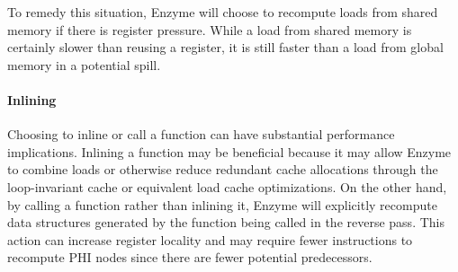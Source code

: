 To remedy this situation, Enzyme will choose to recompute loads from shared memory if there is register pressure. While a load from shared memory is certainly slower than reusing a register, it is still faster than a load from global memory in a potential spill. 

\paragraph{\textbf{Inlining}}
Choosing to inline or call a function can have substantial performance implications. Inlining a function may be beneficial because it may allow Enzyme to combine loads or otherwise reduce redundant cache allocations through the loop-invariant cache or equivalent load cache optimizations. On the other hand, by calling a function rather than inlining it, Enzyme will explicitly recompute data structures generated by the function being called in the reverse pass. This action can increase register locality and may require fewer instructions to recompute PHI nodes since there are fewer potential predecessors.





